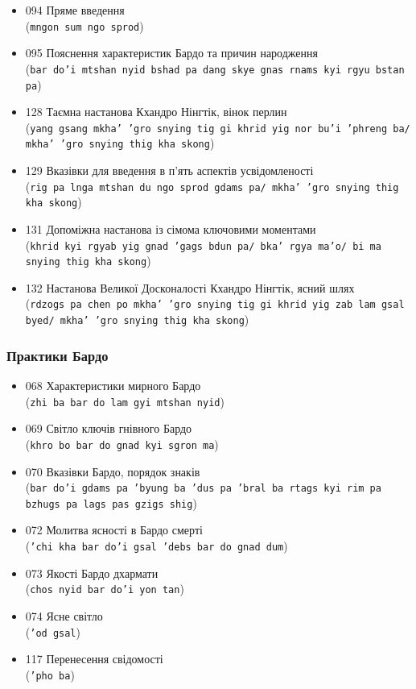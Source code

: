 \documentclass{article}
\begin{document}
\begin{itemize}
\item 094 Пряме введення \\ (\texttt{mngon sum ngo sprod})
\item 095 Пояснення характеристик Бардо та причин народження \\ (\texttt{bar do'i mtshan nyid bshad pa dang skye gnas rnams kyi rgyu bstan pa})
\item 128 Таємна настанова Кхандро Нінгтік, вінок перлин \\ (\texttt{yang gsang mkha' 'gro snying tig gi khrid yig nor bu'i 'phreng ba/ mkha' 'gro snying thig kha skong})
\item 129 Вказівки для введення в п’ять аспектів усвідомленості \\ (\texttt{rig pa lnga mtshan du ngo sprod gdams pa/ mkha' 'gro snying thig kha skong})
\item 131 Допоміжна настанова із сімома ключовими моментами \\ (\texttt{khrid kyi rgyab yig gnad 'gags bdun pa/ bka' rgya ma'o/ bi ma snying thig kha skong})
\item 132 Настанова Великої Досконалості Кхандро Нінгтік, ясний шлях \\ (\texttt{rdzogs pa chen po mkha' 'gro snying tig gi khrid yig zab lam gsal byed/ mkha' 'gro snying thig kha skong})
\end{itemize}
\endgroup

\subsubsection{Практики Бардо}

\begingroup\raggedright
\begin{itemize}
\item 068 Характеристики мирного Бардо \\ (\texttt{zhi ba bar do lam gyi mtshan nyid})
\item 069 Світло ключів гнівного Бардо \\ (\texttt{khro bo bar do gnad kyi sgron ma})
\item 070 Вказівки Бардо, порядок знаків \\ (\texttt{bar do'i gdams pa 'byung ba 'dus pa 'bral ba rtags kyi rim pa bzhugs pa lags pas gzigs shig})
\item 072 Молитва ясності в Бардо смерті \\ (\texttt{'chi kha bar do'i gsal 'debs bar do gnad dum})
\item 073 Якості Бардо дхармати \\ (\texttt{chos nyid bar do'i yon tan})
\item 074 Ясне світло \\ (\texttt{'od gsal})
\item 117 Перенесення свідомості \\ (\texttt{'pho ba})
\end{itemize}
\endgroup
\end{document}
